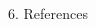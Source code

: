 \documentclass[final]{beamer}
\begin{document}
\begin{frame}[t]
\begin{columns}[t,totalwidth=\textwidth]
\begin{column}{0.3\textwidth}
\begin{block}{6. References}
    

    \end{block}
    
    
  

 
        
                

\end{column}
\end{columns}
\end{frame}
\end{document}
